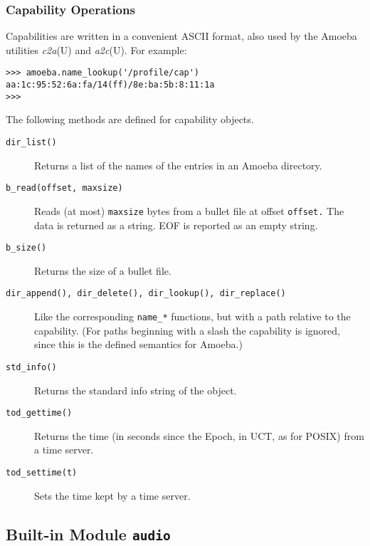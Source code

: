 \subsubsection{Capability Operations}

Capabilities are written in a convenient ASCII format, also used by the
Amoeba utilities
{\em c2a}(U)
and
{\em a2c}(U).
For example:
\bcode\begin{verbatim}
>>> amoeba.name_lookup('/profile/cap')
aa:1c:95:52:6a:fa/14(ff)/8e:ba:5b:8:11:1a
>>> 
\end{verbatim}\ecode
The following methods are defined for capability objects.
\begin{description}
\item[{\tt dir\_list()}]
Returns a list of the names of the entries in an Amoeba directory.
\item[{\tt b\_read(offset, maxsize)}]
Reads (at most)
{\tt maxsize}
bytes from a bullet file at offset
{\tt offset.}
The data is returned as a string.
EOF is reported as an empty string.
\item[{\tt b\_size()}]
Returns the size of a bullet file.
\item[{\tt dir\_append(), dir\_delete(), dir\_lookup(), dir\_replace()}]
\itembreak
Like the corresponding
{\tt name\_*}
functions, but with a path relative to the capability.
(For paths beginning with a slash the capability is ignored, since this
is the defined semantics for Amoeba.)
\item[{\tt std\_info()}]
Returns the standard info string of the object.
\item[{\tt tod\_gettime()}]
Returns the time (in seconds since the Epoch, in UCT, as for POSIX) from
a time server.
\item[{\tt tod\_settime(t)}]
Sets the time kept by a time server.
\end{description}

\subsection{Built-in Module {\tt audio}}

